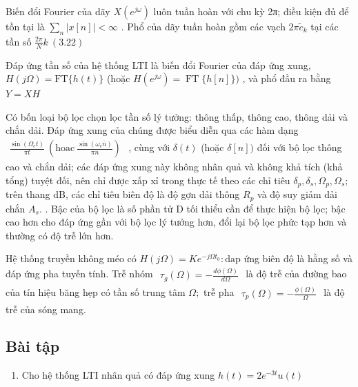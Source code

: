 \documentclass[
  10
]{article}
\providecommand{\tightlist}{%
  \setlength{\itemsep}{0pt}\setlength{\parskip}{0pt}}
\begin{document}
Biến đổi Fourier của dãy \(X ( e ^ { j \omega } )\) luôn tuần hoàn với
chu kỳ 2π; điều kiện đủ để tồn tại là
\(\textstyle \sum _ { n } | x [ n ] | < \infty\) . Phổ của dãy tuần hoàn
gồm các vạch \(2 \pi \tilde { c } _ { k }\) tại các tần số
\(\frac { 2 \pi } { N } k \ ( 3 . 2 2 )\)

Đáp ứng tần số của hệ thống LTI là biến đổi Fourier của đáp ứng xung,
\(H ( j \Omega ) = \mathrm { F T } \{ h ( t ) \}\) (hoặc
\(H ( e ^ { j \omega } ) = \operatorname { F T } \{ h [ n ] \} )\) , và
phổ đầu ra bằng \(Y = X H\)

Có bốn loại bộ lọc chọn lọc tần số lý tưởng: thông thấp, thông cao,
thông dải và chắn dải. Đáp ứng xung của chúng được biểu diễn qua các hàm
dạng
\(\begin{array} { l } { { \frac { \sin ( \Omega _ { c } t ) } { \pi t } \ ( \mathrm { h o a c ~ } \frac { \sin ( \omega _ { c } \bar { n } ) } { \pi n } ) } } \end{array}\)
, cùng với \(\delta ( t )\) (hoặc \(\delta [ n ] )\) đối với bộ lọc
thông cao và chắn dải; các đáp ứng xung này không nhân quả và không khả
tích (khả tổng) tuyệt đối, nên chỉ được xấp xỉ trong thực tế theo các
chỉ tiêu
\(\delta _ { p } , \delta _ { s } , \Omega _ { p } , \Omega _ { s } ;\)
trên thang dB, các chỉ tiêu biên độ là độ gợn dải thông \(R _ { p }\) và
độ suy giảm dải chắn \(A _ { s } .\) . Bậc của bộ lọc là số phần tử D
tối thiểu cần để thực hiện bộ lọc; bậc cao hơn cho đáp ứng gần với bộ
lọc lý tưởng hơn, đổi lại bộ lọc phức tạp hơn và thường có độ trễ lớn
hơn.

Hệ thống truyền không méo có
\(H ( j \Omega ) = K e ^ { - j \Omega t _ { 0 } } \colon \mathrm { d a p }\)
ứng biên độ là hằng số và đáp ứng pha tuyến tính. Trễ nhóm
\(\begin{array} { r } { \tau _ { g } ( \Omega ) = - \frac { d \phi ( \Omega ) } { d \Omega } } \end{array}\)
là độ trễ của đường bao của tín hiệu băng hẹp có tần số trung tâm
\(\Omega ;\) trễ pha
\(\begin{array} { r } { \tau _ { p } ( \Omega ) = - \frac { \phi ( \Omega ) } { \Omega } } \end{array}\)
là độ trễ của sóng mang.

\subsection{Bài tập}\label{buxe0i-tux1eadp-2}

\begin{enumerate}
\def\labelenumi{\arabic{enumi}.}
\tightlist
\item
  Cho hệ thống LTI nhân quả có đáp ứng xung
  \(h ( t ) = 2 e ^ { - 3 t } u ( t )\)
\end{enumerate}
\end{document}
